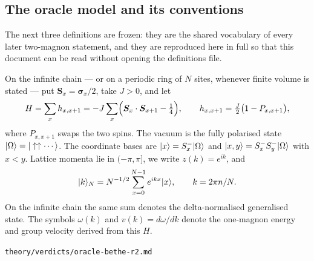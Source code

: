 \subsection{The oracle model and its conventions}

The next three definitions are frozen: they are the shared vocabulary of every
later two-magnon statement, and they are reproduced here in full so that this
document can be read without opening the definitions file.

\begin{definition}
\label{def:fm-oracle-model}
On the infinite chain --- or on a periodic ring of $N$ sites, whenever finite
volume is stated --- put $\bm{S}_x=\bm{\sigma}_x/2$, take $J>0$, and let
\begin{equation}
  H=\sum_x h_{x,x+1}
   =-J\sum_x\Bigl(\bm{S}_x\cdot\bm{S}_{x+1}-\tfrac14\Bigr),
  \qquad
  h_{x,x+1}=\tfrac{J}{2}\bigl(1-P_{x,x+1}\bigr),
\end{equation}
where $P_{x,x+1}$ swaps the two spins. The vacuum is the fully polarised state
$|\Omega\rangle=|\uparrow\uparrow\cdots\rangle$. The coordinate bases are
$|x\rangle=S^-_x|\Omega\rangle$ and $|x,y\rangle=S^-_xS^-_y|\Omega\rangle$ with $x<y$.
Lattice momenta lie in $(-\pi,\pi]$, we write $z(k)=e^{ik}$, and
\begin{equation}
  |k\rangle_N=N^{-1/2}\sum_{x=0}^{N-1}e^{ikx}|x\rangle,
  \qquad k=2\pi n/N .
\end{equation}
On the infinite chain the same sum denotes the delta-normalised generalised
state. The symbols $\omega(k)$ and $v(k)=d\omega/dk$ denote the one-magnon
energy and group velocity derived from this $H$.
\end{definition}
%
{\texttt{theory/verdicts/oracle-bethe-r2.md}}

